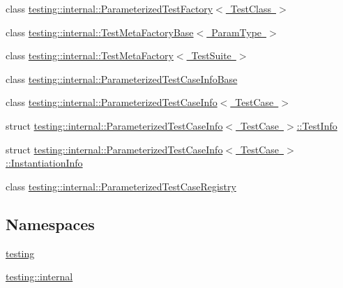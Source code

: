 \begin{DoxyCompactItemize}
\item 
class \mbox{\hyperlink{classtesting_1_1internal_1_1_parameterized_test_factory}{testing\+::internal\+::\+Parameterized\+Test\+Factory$<$ Test\+Class $>$}}
\item 
class \mbox{\hyperlink{classtesting_1_1internal_1_1_test_meta_factory_base}{testing\+::internal\+::\+Test\+Meta\+Factory\+Base$<$ Param\+Type $>$}}
\item 
class \mbox{\hyperlink{classtesting_1_1internal_1_1_test_meta_factory}{testing\+::internal\+::\+Test\+Meta\+Factory$<$ Test\+Suite $>$}}
\item 
class \mbox{\hyperlink{classtesting_1_1internal_1_1_parameterized_test_case_info_base}{testing\+::internal\+::\+Parameterized\+Test\+Case\+Info\+Base}}
\item 
class \mbox{\hyperlink{classtesting_1_1internal_1_1_parameterized_test_case_info}{testing\+::internal\+::\+Parameterized\+Test\+Case\+Info$<$ Test\+Case $>$}}
\item 
struct \mbox{\hyperlink{structtesting_1_1internal_1_1_parameterized_test_case_info_1_1_test_info}{testing\+::internal\+::\+Parameterized\+Test\+Case\+Info$<$ Test\+Case $>$\+::\+Test\+Info}}
\item 
struct \mbox{\hyperlink{structtesting_1_1internal_1_1_parameterized_test_case_info_1_1_instantiation_info}{testing\+::internal\+::\+Parameterized\+Test\+Case\+Info$<$ Test\+Case $>$\+::\+Instantiation\+Info}}
\item 
class \mbox{\hyperlink{classtesting_1_1internal_1_1_parameterized_test_case_registry}{testing\+::internal\+::\+Parameterized\+Test\+Case\+Registry}}
\end{DoxyCompactItemize}
\subsection*{Namespaces}
\begin{DoxyCompactItemize}
\item 
 \mbox{\hyperlink{namespacetesting}{testing}}
\item 
 \mbox{\hyperlink{namespacetesting_1_1internal}{testing\+::internal}}
\end{DoxyCompactItemize}

